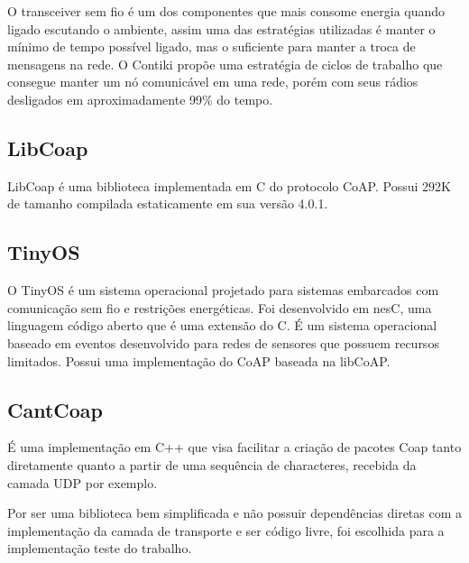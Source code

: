 O transceiver sem fio \'e um dos componentes que mais consome energia quando ligado escutando o ambiente, assim uma das estrat\'egias utilizadas \'e manter o m\'inimo de tempo poss\'ivel ligado, mas o suficiente para manter a troca de mensagens na rede. O Contiki prop\~oe uma estrat\'egia de ciclos de trabalho que consegue manter um n\'o comunic\'avel em uma rede, por\'em com seus r\'adios desligados em aproximadamente 99\% do tempo.

\subsection{LibCoap}
LibCoap \'e uma biblioteca implementada em C do protocolo CoAP. Possui 292K de tamanho compilada estaticamente em sua vers\~ao 4.0.1.


\subsection{TinyOS}
O TinyOS \'e um sistema operacional projetado para sistemas embarcados com comunica\c{c}\~ao sem fio e restri\c{c}\~oes energ\'eticas. Foi desenvolvido em nesC, uma linguagem c\'odigo aberto que \'e uma extens\~ao do C. \'E um sistema operacional baseado em eventos desenvolvido para redes de sensores que possuem recursos limitados. Possui uma implementa\c{c}\~ao do CoAP baseada na libCoAP.

\subsection{CantCoap}
\'E uma implementa\c{c}\~ao em C++ que visa facilitar a cria\c{c}\~ao de pacotes Coap tanto diretamente quanto a partir de uma sequ\^encia de characteres, recebida da camada UDP por exemplo.

Por ser uma biblioteca bem simplificada e n\~ao possuir depend\^encias diretas com a implementa\c{c}\~ao da camada de transporte e ser c\'odigo livre, foi escolhida para a implementa\c{c}\~ao teste do trabalho.
